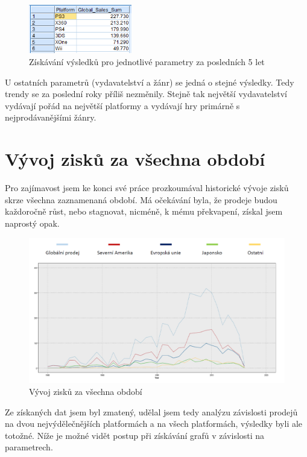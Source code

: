 \documentclass[FM,ZP]{tulthesis}
\begin{document}
\begin{figure}[H]
\begin{center}
\includegraphics[width=0.4\textwidth]{images/fiveYearPlatform.png}
\caption{Získávání výsledků pro jednotlivé parametry za posledních 5 let}
\label{image}
\end{center}
\end{figure}

U ostatních parametrů (vydavatelství a žánr) se jedná o stejné výsledky. Tedy trendy se za poslední roky příliš nezměnily. Stejně tak největší vydavatelství vydávají pořád na největší platformy a vydávají hry primárně s nejprodávanějšími žánry.

\section{Vývoj zisků za všechna období}
Pro zajímavost jsem ke konci své práce prozkoumával historické vývoje zisků skrze všechna zaznamenaná období. Má očekávání byla, že prodeje budou každoročně růst, nebo stagnovat, nicméně, k mému překvapení, získal jsem naprostý opak.

\begin{figure}[H]
\begin{center}
\includegraphics[width=\textwidth]{images/graphOfSales.png}
\caption{Vývoj zisků za všechna období}
\label{image}
\end{center}
\end{figure}

Ze získaných dat jsem byl zmatený, udělal jsem tedy analýzu závislosti prodejů na dvou nejvýdělečnějších platformách a na všech platformách, výsledky byli ale totožné. Níže je možné vidět postup při získávání grafů v závislosti na parametrech.
\end{document}
